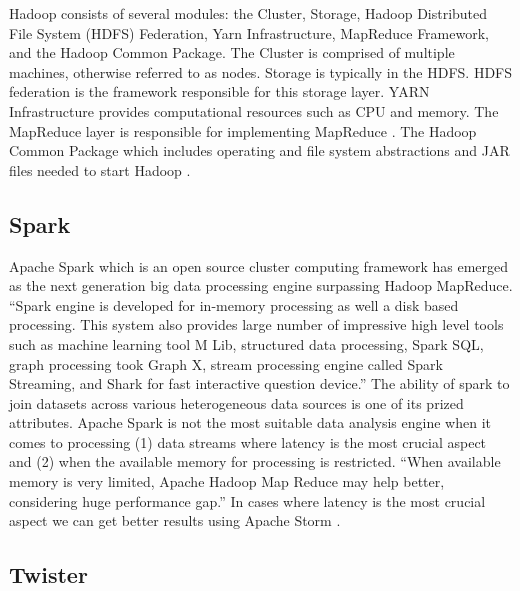      Hadoop consists of several modules: the Cluster, Storage, Hadoop 
     Distributed File System (HDFS) Federation, Yarn Infrastructure, 
     MapReduce Framework, and the Hadoop Common Package.  The Cluster 
     is comprised of multiple machines, otherwise referred to as nodes.  
     Storage is typically in the HDFS.  HDFS federation is the framework 
     responsible for this storage layer.  YARN Infrastructure provides 
     computational resources such as CPU and memory. The MapReduce layer 
     is responsible for implementing MapReduce \cite{www-hadooparch2}.  
     The Hadoop Common Package which includes operating and file system 
     abstractions and JAR files needed to start Hadoop 
     \cite{www-wikihadoop}. 


\subsection{Spark}

     Apache Spark which is an open source cluster computing framework
     has emerged as the next generation big data processing engine
     surpassing Hadoop MapReduce. ``Spark engine is developed for
     in-memory processing as well a disk based processing. This system
     also provides large number of impressive high level tools such as
     machine learning tool M Lib, structured data processing, Spark
     SQL, graph processing took Graph X, stream processing engine
     called Spark Streaming, and Shark for fast interactive question
     device.'' The ability of spark to join datasets across various
     heterogeneous data sources is one of its prized
     attributes. Apache Spark is not the most suitable data analysis
     engine when it comes to processing (1) data streams where latency
     is the most crucial aspect and (2) when the available memory for
     processing is restricted. ``When available memory is very limited,
     Apache Hadoop Map Reduce may help better, considering huge
     performance gap.'' In cases where latency is the most crucial
     aspect we can get better results using Apache Storm \cite{www-spark}.
     
\subsection{Twister}

